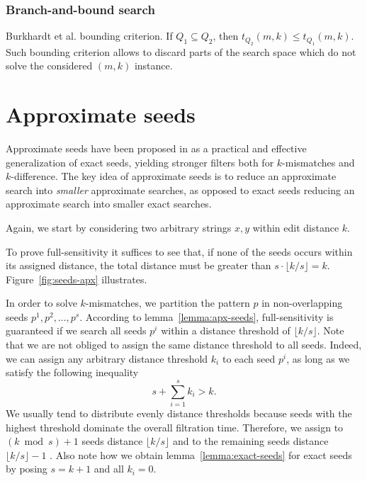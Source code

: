 \subsubsection{Branch-and-bound search}

Burkhardt et al. \citep{Burkhardt2001} bounding criterion. If $Q_1 \subseteq Q_2$, then $t_{Q_2}(m,k) \leq t_{Q_1}(m,k)$.
Such bounding criterion allows to discard parts of the search space which do not solve the considered $(m,k)$ instance.


\section{Approximate seeds}
\label{sec:seeds-apx}

Approximate seeds have been proposed in \citep{Myers1994,Navarro2000} as a practical and effective generalization of exact seeds, yielding stronger filters both for $k$-mismatches and $k$-difference.
The key idea of approximate seeds is to reduce an approximate search into \emph{smaller} approximate searches, as opposed to exact seeds reducing an approximate search into smaller exact searches.

Again, we start by considering two arbitrary strings $x,y$ within edit distance $k$.
To prove full-sensitivity it suffices to see that, if none of the seeds occurs within its assigned distance, the total distance must be greater than $s \cdot \lfloor k/s \rfloor = k$.
Figure~\ref{fig:seeds-apx} illustrates.

In order to solve $k$-mismatches, we partition the pattern $p$ in non-overlapping seeds $p^1, p^2, \dots, p^s$. According to lemma~\ref{lemma:apx-seeds}, full-sensitivity is guaranteed if we search all seeds $p^i$ within a distance threshold of $\lfloor k/s \rfloor$.
Note that we are not obliged to assign the same distance threshold to all seeds.
Indeed, we can assign any arbitrary distance threshold $k_i$ to each seed $p^i$, as long as we satisfy the following inequality
\begin{equation}
s + \sum_{i=1}^{s}{k_i} > k.
\end{equation}
We usually tend to distribute evenly distance thresholds because seeds with the highest threshold dominate the overall filtration time.
Therefore, we assign to $(k \bmod{s}) + 1$ seeds distance $\lfloor k/s \rfloor$ and to the remaining seeds distance $\lfloor k/s \rfloor - 1$ \citep{Siragusa2013}.
Also note how we obtain lemma~\ref{lemma:exact-seeds} for exact seeds by posing $s=k+1$ and all $k_i = 0$.

